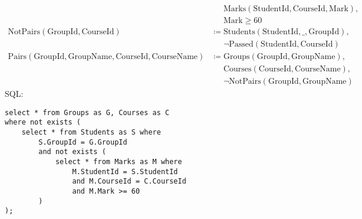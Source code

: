\documentclass{article}
\newcommand{\Students}{\mathrm{Students}}
\newcommand{\StudentId}{\mathrm{StudentId}}
\newcommand{\Groups}{\mathrm{Groups}}
\newcommand{\GroupId}{\mathrm{GroupId}}
\newcommand{\GroupName}{\mathrm{GroupName}}
\newcommand{\Courses}{\mathrm{Courses}}
\newcommand{\CourseId}{\mathrm{CourseId}}
\newcommand{\CourseName}{\mathrm{CourseName}}
\newcommand{\Marks}{\mathrm{Marks}}
\newcommand{\Mark}{\mathrm{Mark}}
\newcommand{\poloneq}{\mathrel{\phantom{\coloneq}}}
\begin{document}
\begin{enumerate}
\begin{align*}
        &\poloneq \Marks(\StudentId, \CourseId, \Mark), \\
        &\poloneq \Mark \geq 60 \\
        \mathrm{NotPairs}(\GroupId, \CourseId)
        &\coloneq \Students(\StudentId, \_, \GroupId), \\
        &\poloneq \neg \mathrm{Passed}(\StudentId, \CourseId) \\
        \mathrm{Pairs}(\GroupId, \GroupName, \CourseId, \CourseName)
        &\coloneq \Groups(\GroupId, \GroupName), \\
        &\poloneq \Courses(\CourseId, \CourseName), \\
        &\poloneq \neg \mathrm{NotPairs}(\GroupId, \GroupName)
    \end{align*}
    SQL:
    \begin{verbatim}
select * from Groups as G, Courses as C
where not exists (
    select * from Students as S where
        S.GroupId = G.GroupId
        and not exists (
            select * from Marks as M where
                M.StudentId = S.StudentId
                and M.CourseId = C.CourseId
                and M.Mark >= 60
        )
);
    \end{verbatim}
\end{enumerate}
\end{document}
